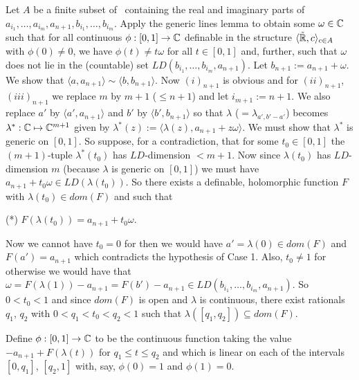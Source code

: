 \documentclass[12pt,nodate]{article}
\begin{document}
Let $A$ be a finite subset of \R\ containing the real and imaginary parts of
$a_{i_1} , \ldots , a_{i_m} , a_{n+1} , b_{i_1} , \ldots , b_{i_m}$. Apply the generic lines lemma to obtain some $\omega \in \mathbb{C}$ such that for all continuous $\phi : [0, 1] \rightarrow \mathbb{C}$ definable in the structure $\langle \tilde{\mathbb{R}}, c \rangle_{c \in A}$ with $\phi (0) \neq 0$, we have $\phi (t) \neq t\omega $ for all $t \in [0, 1]$ and, further,
such that $\omega$ does not lie in the (countable) set $LD(b_{i_1} , \ldots , b_{i_m} , a_{n+1})$.
Let $b_{n+1} := a_{n+1} + \omega$. We show that $\langle a, a_{n+1} \rangle \sim  \langle b, b_{n+1} \rangle$. 
Now $(i)_{n+1}$ is obvious and for $(ii)_{n+1}$, $(iii)_{n+1}$ we replace $m$ by $m+1$ ($\leq n+1$) and let $i_{m+1} := n+1$. We also replace $a'$ by $\langle a', a_{n+1} \rangle$ and $b'$ by $\langle b', b_{n+1} \rangle$ so that $\lambda$ ($=  \lambda_{a', b'-a'}$) becomes $\lambda^* : \mathbb{C} \mapsto \mathbb{C}^{m+1}$ given by $\lambda^* (z) := \langle \lambda (z), a_{n+1} + z\omega \rangle$. We must show that $\lambda^*$ is generic on $[0, 1]$. So suppose, for a contradiction, that for some $t_0 \in [0, 1]$ the $(m+1)$-tuple $\lambda^* (t_0 )$ has $LD$-dimension $< m+1$. Now since $\lambda (t_0 )$ has $LD$-dimension $m$ (because $\lambda$ is generic on $[0, 1]$) we must have $a_{n+1} + t_0 \omega \in LD(\lambda (t_0 ))$. So there exists a definable, holomorphic function $F$ with $\lambda (t_0 ) \in dom(F)$ and such that

\vspace{3mm}

\noindent
(*)   \hspace{20mm} $F(\lambda (t_0 )) = a_{n+1} + t_0 \omega $.

\vspace{3mm}

Now we cannot have $t_0 = 0$ for then we would have $a' = \lambda (0) \in dom(F)$ and  $F(a' ) = a_{n+1}$ which contradicts the hypothesis of Case 1. Also, $t_0 \neq 1$ for otherwise we would have that $\omega = F(\lambda (1)) - a_{n+1} =  F(b') - a_{n+1} \in LD( b_{i_1} , \ldots , b_{i_m} , a_{n+1})$.
So $0 < t_0 < 1$ and since $dom(F)$ is open and $\lambda$ is continuous, there
exist rationals $q_1$, $q_2$ with $0 < q_1 < t_0 < q_2 < 1$ such that $\lambda ([q_1 ,q_2 ]) \subseteq dom(F)$.



Define $\phi : [0, 1] \rightarrow \mathbb{C}$ to be the continuous function
taking the value $-a_{n+1} + F(\lambda (t))$ for $q_1 \leq t \leq q_2$  and which is linear on each of the intervals $[0, q_1 ]$, $[q_2 ,1]$ with, say, $\phi (0) = 1$ and $\phi (1) = 0$.
\end{document}
